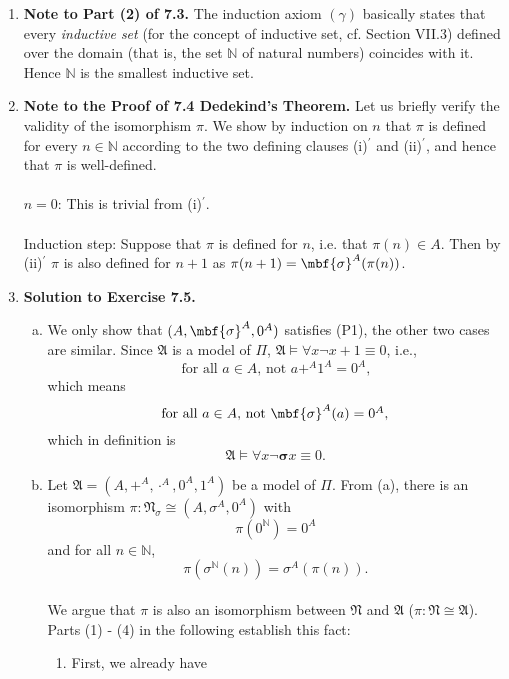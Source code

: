 \begin{enumerate}[1.]
\item \textbf{Note to Part (2) of 7.3.} The induction axiom $(\gamma)$ basically states that every \emph{inductive set} (for the concept of inductive set, cf. Section VII.3) defined over the domain (that is, the set $\mathbb{N}$ of natural numbers) coincides with it. Hence $\mathbb{N}$ is the smallest inductive set.
%
\item \textbf{Note to the Proof of 7.4 Dedekind's Theorem.} Let us briefly verify the validity of the isomorphism $\pi$. We show by induction on $n$ that $\pi$ is defined for every $n \in \mathbb{N}$ according to the two defining clauses (i)$^\prime$ and (ii)$^\prime$, and hence that $\pi$ is well-defined.\\
\\
$n = 0$: This is trivial from (i)$^\prime$.\\
\\
Induction step: Suppose that $\pi$ is defined for $n$, i.e. that $\pi(n) \in A$. Then by (ii)$^\prime$ $\pi$ is also defined for $n + 1$ as $\pi(n + 1) = \mbf{\sigma}^A(\pi(n))$.   
\item \textbf{Solution to Exercise 7.5.}
\begin{enumerate}[(a)]
\item We only show that $(A, \mbf{\sigma}^A, 0^A)$ satisfies (P1), the other two cases are similar. Since $\mathfrak{A}$ is a model of $\Pi$, $\mathfrak{A} \models \forall x \neg x + 1 \equiv 0$, i.e.,
\[
\mbox{for all $a \in A$, not $a +^A 1^A = 0^A$,}
\]
which means
\[
\mbox{for all $a \in A$, not $\mbf{\sigma}^A(a) = 0^A$,}
\]
which in definition is
\[
\mathfrak{A} \models \forall x \neg \mathbf{\sigma} x \equiv 0.
\]
\item Let $\mathfrak{A} = (A, +^A, \cdot^A, 0^A, 1^A)$ be a model of $\Pi$. From (a), there is an isomorphism $\pi : \mathfrak{N}_\sigma \cong (A, \sigma^A, 0^A)$ with
\[
\pi(0^\mathbb{N}) = 0^A
\]
and for all $n \in \mathbb{N}$,
\[
\pi(\sigma^\mathbb{N}(n)) = \sigma^A(\pi(n)).
\]
\\
We argue that $\pi$ is also an isomorphism between $\mathfrak{N}$ and $\mathfrak{A}$ ($\pi: \mathfrak{N} \cong \mathfrak{A}$). Parts (1) - (4) in the following establish this fact:\\
\begin{enumerate}[1)]
\item First, we already have

\end{enumerate}
\end{enumerate}
\end{enumerate}
